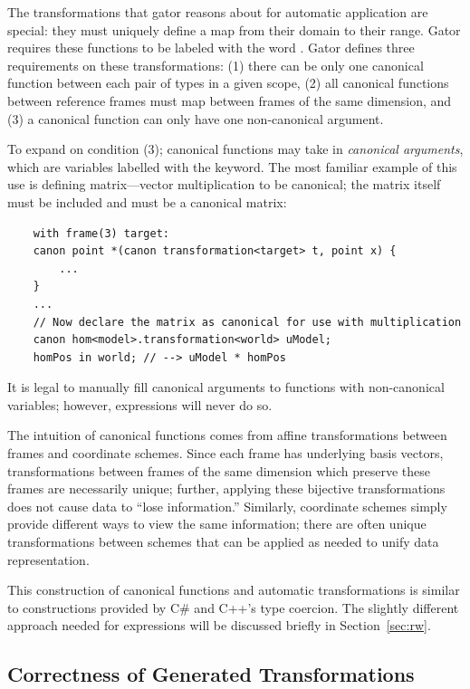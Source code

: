\documentclass[../main.tex]{subfiles}
\begin{document}
The transformations that gator reasons about for automatic application are special: they must uniquely define a map from their domain to their range. 
Gator requires these functions to be labeled with the word .
Gator defines three requirements on these transformations:
(1) there can be only one canonical function between each pair of types in a given scope, (2) all canonical functions between reference frames must map between frames of the same dimension, and (3) a canonical function can only have one non-canonical argument.

To expand on condition (3); canonical functions may take in \emph{canonical arguments}, which are variables labelled with the  keyword.  The most familiar example of this use is defining matrix---vector multiplication to be canonical; the matrix itself must be included and must be a canonical matrix:
%
\begin{verbatim}
	with frame(3) target:
	canon point *(canon transformation<target> t, point x) {
		...
	}
	...
	// Now declare the matrix as canonical for use with multiplication
	canon hom<model>.transformation<world> uModel;
	homPos in world; // --> uModel * homPos
\end{verbatim}
%
It is legal to manually fill canonical arguments to functions with non-canonical variables; however,  expressions will never do so.

The intuition of canonical functions comes from affine transformations between frames and coordinate schemes.
Since each frame has underlying basis vectors, transformations between frames of the same dimension which preserve these frames are necessarily unique; further, applying these bijective transformations does not cause data to ``lose information.''
Similarly, coordinate schemes simply provide different ways to view the same information; there are often unique transformations between schemes that can be applied as needed to unify data representation.

This construction of canonical functions and automatic transformations is similar to constructions provided by C\# and C++'s type coercion.
The slightly different approach needed for  expressions will be discussed briefly in Section~\ref{sec:rw}.

\subsection{Correctness of Generated Transformations}
\end{document}
